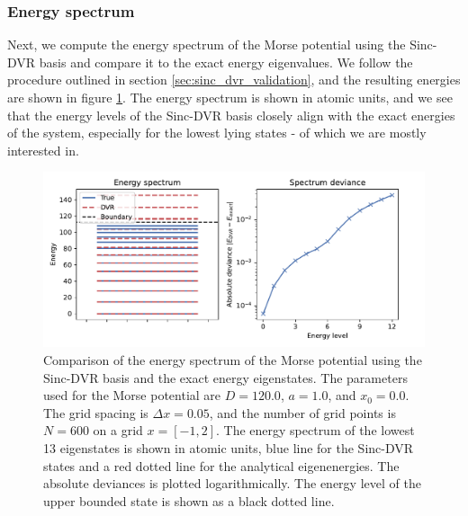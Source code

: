 \documentclass{subfiles}
\begin{document}
\subsubsection*{Energy spectrum}
Next, we compute the energy spectrum of the Morse potential using the Sinc-DVR basis and compare it to the exact energy eigenvalues. We follow the procedure outlined in section \ref{sec:sinc_dvr_validation}, and the resulting energies are shown in figure \ref{fig:dvr_validation}. The energy spectrum is shown in atomic units, and we see that the energy levels of the Sinc-DVR basis closely align with the exact energies of the system, especially for the lowest lying states - of which we are mostly interested in. 
\begin{figure}[h!]
    \centering
    \includegraphics[width=\textwidth]{figs/dvr_validation.pdf}
    \caption{Comparison of the energy spectrum of the Morse potential using the Sinc-DVR basis and the exact energy eigenstates. The parameters used for the Morse potential are $D = 120.0$, $a = 1.0$, and $x_0 = 0.0$. The grid spacing is $\Delta x = 0.05$, and the number of grid points is $N = 600$ on a grid $x=[-1, 2]$. The energy spectrum of the lowest 13 eigenstates is shown in atomic units, blue line for the Sinc-DVR states and a red dotted line for the analytical eigenenergies. The absolute deviances is plotted logarithmically. The energy level of the upper bounded state is shown as a black dotted line.}
    \label{fig:dvr_validation}
\end{figure}
\end{document}
